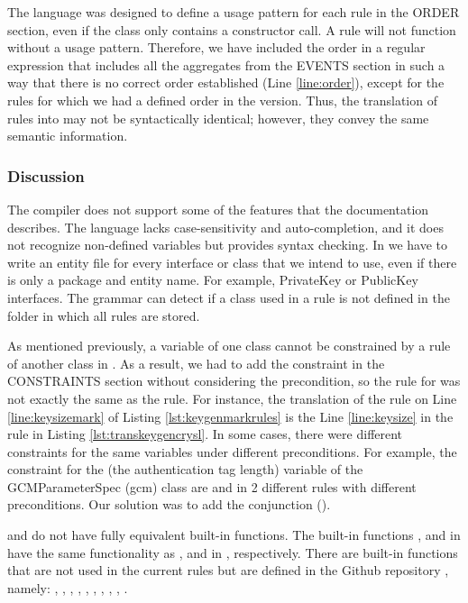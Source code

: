 The \crysl{} language was designed to define a usage pattern for each rule in the ORDER section, even if the class only contains a constructor call. A rule will not function without a usage pattern. Therefore, we have included the order in a regular expression that includes all the aggregates from the EVENTS section in such a way that there is no correct order established (Line \ref{line:order}), except for the rules for which we had a defined order in the \MARK{} version. Thus, the translation of \MARK{} rules into \crysl{} may not be syntactically identical; however, they convey the same semantic information.


\subsubsection*{Discussion}
The \MARK{} compiler does not support some of the features that the documentation \cite{cod} describes. The language lacks case-sensitivity and auto-completion, and it does not recognize non-defined variables but provides syntax checking. In \MARK{} we have to write an entity file for every interface or class that we intend to use, even if there is only a package and entity name. For example, PrivateKey or PublicKey interfaces. The \MARK{} grammar can detect if a class used in a rule is not defined in the folder in which all \MARK{} rules are stored.

As mentioned previously, a variable of one class cannot be constrained by a rule of another class in \crysl. As a result, we had to add the constraint in the CONSTRAINTS section without considering the precondition, so the rule for \crysl{} was not exactly the same as the \MARK{} rule. For instance, the translation of the \MARK{} rule on Line \ref{line:keysizemark} of Listing \ref{lst:keygenmarkrules} is the Line \ref{line:keysize} in the \crysl{} rule in Listing \ref{lst:transkeygencrysl}. In some cases, there were different constraints for the same variables under different preconditions. For example, the constraint for the  (the authentication tag length) variable of the GCMParameterSpec (gcm) class are  and  in 2 different rules with different preconditions. Our solution was to add the conjunction ().

\MARK{} and \crysl{} do not have fully equivalent built-in functions. The built-in functions , and  in \MARK{} have the same functionality as , and  in \crysl, respectively.
There are \MARK{} built-in functions that are not used in the current \MARK{} rules but are defined in the \codyze{} Github repository \cite{codyzegit}, namely: , , , , , , , , ,  \cite{codyzegit}.


